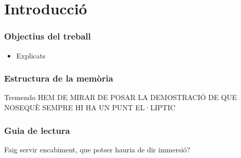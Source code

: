 \chapter{Introducci\'o}



\subsection*{Objectius del treball}

\begin{itemize}
    \item Explicats
\end{itemize}

\subsection*{Estructura de la mem\`oria}
Tremendo
HEM DE MIRAR DE POSAR LA DEMOSTRACIÓ DE QUE NOSEQUÈ SEMPRE HI HA UN PUNT EL·LIPTIC
\subsection*{Guia de lectura}
Faig servir encabiment, que potser hauria de dir immersió?

\setcounter{page}{1}


